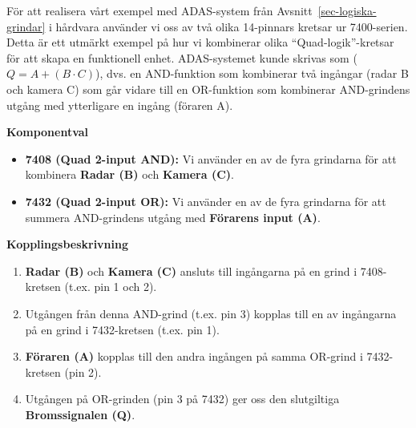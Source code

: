 \documentclass[
  swedish,
  letterpaper,
  oneside,
  openany]{book}
\providecommand{\tightlist}{%
  \setlength{\itemsep}{0pt}\setlength{\parskip}{0pt}}
\begin{document}
\begin{tcolorbox}[enhanced jigsaw, arc=.35mm, bottomrule=.15mm, bottomtitle=1mm, breakable, colback=white, colbacktitle=quarto-callout-note-color!10!white, colframe=quarto-callout-note-color-frame, coltitle=black, left=2mm, leftrule=.75mm, opacityback=0, opacitybacktitle=0.6, rightrule=.15mm, title=\textcolor{quarto-callout-note-color}{\faInfo}\hspace{0.5em}{Exempel: Realisering av ADAS-system}, titlerule=0mm, toprule=.15mm, toptitle=1mm]

För att realisera vårt exempel med ADAS-system från
Avsnitt~\ref{sec-logiska-grindar} i hårdvara använder vi oss av två
olika 14-pinnars kretsar ur 7400-serien. Detta är ett utmärkt exempel på
hur vi kombinerar olika ``Quad-logik''-kretsar för att skapa en
funktionell enhet. ADAS-systemet kunde skrivas som
(\(Q = A + (B \cdot C)\)), dvs. en AND-funktion som kombinerar två
ingångar (radar B och kamera C) som går vidare till en OR-funktion som
kombinerar AND-grindens utgång med ytterligare en ingång (föraren A).

\textbf{Komponentval}

\begin{itemize}
\tightlist
\item
  \textbf{7408 (Quad 2-input AND):} Vi använder en av de fyra grindarna
  för att kombinera \textbf{Radar (B)} och \textbf{Kamera (C)}.
\item
  \textbf{7432 (Quad 2-input OR):} Vi använder en av de fyra grindarna
  för att summera AND-grindens utgång med \textbf{Förarens input (A)}.
\end{itemize}

\textbf{Kopplingsbeskrivning}

\begin{enumerate}
\def\labelenumi{\arabic{enumi}.}
\tightlist
\item
  \textbf{Radar (B)} och \textbf{Kamera (C)} ansluts till ingångarna på
  en grind i 7408-kretsen (t.ex. pin 1 och 2).
\item
  Utgången från denna AND-grind (t.ex. pin 3) kopplas till en av
  ingångarna på en grind i 7432-kretsen (t.ex. pin 1).
\item
  \textbf{Föraren (A)} kopplas till den andra ingången på samma OR-grind
  i 7432-kretsen (pin 2).
\item
  Utgången på OR-grinden (pin 3 på 7432) ger oss den slutgiltiga
  \textbf{Bromssignalen (Q)}.
\end{enumerate}


\end{tcolorbox}
\end{document}
